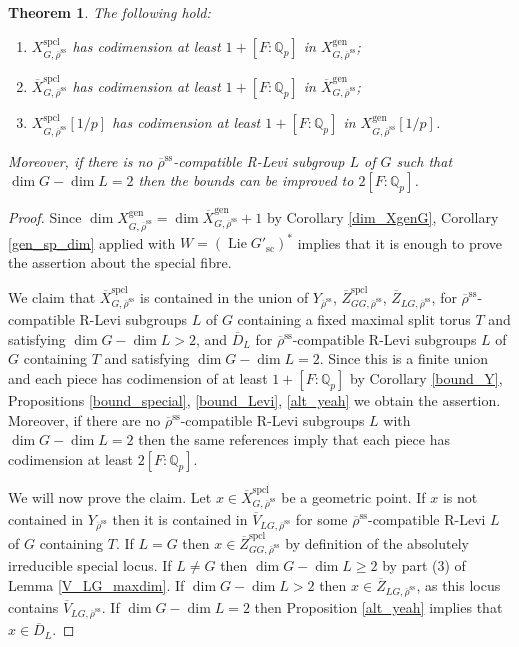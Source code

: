 \documentclass{amsart}
\newtheorem{thm}[prop]{Theorem}
\theoremstyle{definition}
\theoremstyle{remark}
\newcommand{\Qp}{\mathbb {Q}_p}
\newcommand{\Zbar}{\overline{Z}}
\newcommand{\Vbar}{\overline{{V}}}
\newcommand{\rhobar}{\overline{\rho}}
\newcommand{\gen}{\mathrm{gen}}
\newcommand{\Xbar}{\overline{X}}
\DeclareMathOperator{\spcl}{spcl}
\DeclareMathOperator{\Lie}{Lie}
\newcommand{\rhobarss}{\rhobar^{\mathrm{ss}}}
\newcommand{\sic}{\operatorname{sc}}
\begin{document}
\begin{thm}\label{codim_special_locus}  The following hold:
\begin{enumerate}
\item  $X^{\spcl}_{G,\rhobarss}$ has codimension at least $1+[F:\Qp]$ in $X^{\gen}_{G, \rhobarss}$;
\item  $\Xbar^{\spcl}_{G,\rhobarss}$ has codimension at least $1+[F:\Qp]$ in $\Xbar^{\gen}_{G, \rhobarss}$;
\item  $X^{\spcl}_{G,\rhobarss}[1/p]$ has codimension at least $1+[F:\Qp]$ in 
$X^{\gen}_{G, \rhobarss}[1/p]$.
\end{enumerate}
Moreover, if there is no $\rhobarss$-compatible R-Levi subgroup $L$ of $G$ such that $\dim G -\dim L=2$ 
then the bounds can be improved to $2[F:\Qp]$.
\end{thm}
\begin{proof} Since $\dim X^{\gen}_{G, \rhobarss} = \dim \Xbar^{\gen}_{G, \rhobarss} +1$ by 
Corollary \ref{dim_XgenG}, 
Corollary \ref{gen_sp_dim} applied with $W= (\Lie G'_{\sic})^*$ implies that 
it is enough to prove the assertion about the special fibre.

We claim that $\Xbar^{\spcl}_{G,\rhobarss}$ is contained in the union of $Y_{\rhobarss}$, $\Zbar^{\spcl}_{GG, \rhobarss}$, 
$\Zbar_{LG, \rhobarss}$, for $\rhobarss$-compatible R-Levi subgroups $L$ of $G$ containing a fixed maximal split torus $T$ and satisfying $\dim G -\dim L > 2$, and $\overline{D}_L$ 
 for $\rhobarss$-compatible R-Levi subgroups 
$L$ of $G$ containing $T$ and satisfying $\dim G - \dim L =2$. Since this is a finite union and 
each piece has codimension of at least $1+[F:\Qp]$ by Corollary \ref{bound_Y}, Propositions \ref{bound_special}, 
\ref{bound_Levi}, \ref{alt_yeah} we obtain the assertion. Moreover, if there are no $\rhobarss$-compatible 
R-Levi subgroups $L$ with $\dim G-\dim L=2$ then the same references imply that each piece
has codimension at least $2[F:\Qp]$. 



We will now prove the claim. Let $x\in \Xbar^{\spcl}_{G,\rhobarss}$ be a geometric point. 
If $x$ is not contained in $Y_{\rhobarss}$ then it is contained in $\Vbar_{LG, \rhobarss}$ for some 
$\rhobarss$-compatible R-Levi $L$ of $G$ containing $T$. If $L=G$ then $x\in \Zbar^{\spcl}_{GG, \rhobarss}$ by definition of the absolutely irreducible special locus. 
If $L\neq G$ then $\dim G - \dim L\ge 2$ by part (3) of Lemma \ref{V_LG_maxdim}.  
If $\dim G-\dim L >2$ then $x\in \Zbar_{LG, \rhobarss}$, as this locus contains $\Vbar_{LG, \rhobarss}$. 
If $\dim G -\dim L=2$ then Proposition \ref{alt_yeah} implies that $x\in \overline{D}_L$.
\end{proof} 
\end{document}
